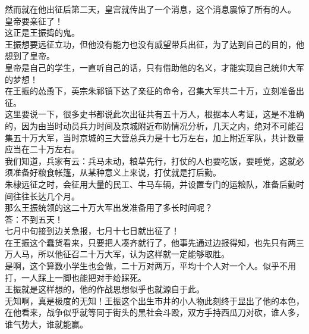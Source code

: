\begin{multicols}{\theparacolNo}
然而就在他出征后第二天，皇宫就传出了一个消息，这个消息震惊了所有的人。\\

皇帝要亲征了！\\

这正是王振捣的鬼。\\

王振想要远征立功，但他没有能力也没有威望带兵出征，为了达到自己的目的，他想到了皇帝。\\

皇帝是自己的学生，一直听自己的话，只有借助他的名义，才能实现自己统帅大军的梦想！\\

在王振的怂恿下，英宗朱祁镇下达了亲征的命令，召集大军共二十万，立刻准备出征。\\

这里要说一下，很多史书都说此次出征共有五十万人，根据本人考证，这是不准确的，因为由当时动员兵力时间及京城附近布防情况分析，几天之内，绝对不可能召集五十万大军，当时京城的三大营总兵力是十七万左右，加上附近军队，共计数量应当在二十万左右。\\

我们知道，兵家有云：兵马未动，粮草先行，打仗的人也要吃饭，要睡觉，这就必须准备好粮食帐篷，从某种意义上来说，打仗就是打后勤。\\

朱棣远征之时，会征用大量的民工、牛马车辆，并设置专门的运粮队，准备后勤时间往往长达几个月。\\

那么王振统领的这二十万大军出发准备用了多长时间呢？\\

答：不到五天！\\

七月中旬接到边关急报，七月十七日就出征了！\\

在王振这个蠢货看来，只要把人凑齐就行了，他事先通过边报得知，也先只有两三万人马，所以他征召二十万大军，认为这样就一定能够取胜。\\

是啊，这个算数小学生也会做，二十万对两万，平均十个人对一个人。似乎不用打，一人踩上一脚也能把对手给踩死。\\

王振就是这样想的，他的作战思想似乎也就源自于此。\\

无知啊，真是极度的无知！王振这个出生市井的小人物此刻终于显出了他的本色，在他看来，战争似乎就等同于街头的黑社会斗殴，双方手持西瓜刀对砍，谁人多，谁气势大，谁就能赢。\\


\end{multicols}
